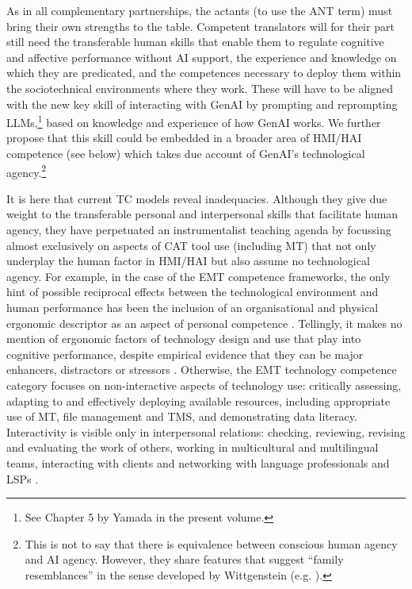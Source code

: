 \documentclass[output=paper]{langscibook}
\begin{document}
As in all complementary partnerships, the actants (to use the ANT term) must bring their own strengths to the table. Competent translators will for their part still need the transferable human skills that enable them to regulate cognitive and affective performance without AI support, the experience and knowledge on which they are predicated, and the competences necessary to deploy them within the sociotechnical environments where they work. These will have to be aligned with the new key skill of interacting with GenAI by prompting and reprompting LLMs,\footnote{ \textrm{See} Chapter 5 by Yamada \textrm{in the present volume.}} based on knowledge and experience of how GenAI works. We further propose that this skill could be embedded in a broader area of HMI/HAI competence (see below) which takes due account of GenAI’s technological agency.\footnote{ \textrm{This is not to say that there is equivalence between conscious human agency and AI agency. However, they share features that suggest “family resemblances” in the sense developed by Wittgenstein (e.g. \citeyear[32]{wittgenstein_philosophical_1958}).}}

It is here that current TC models reveal inadequacies. Although they give due weight to the transferable personal and interpersonal skills that facilitate human agency, they have perpetuated an instrumentalist teaching agenda 
by focussing almost exclusively on aspects of CAT tool use (including MT) that not only underplay the human factor in HMI/HAI but also assume no technological agency. For example, in the case of the EMT competence frameworks, the only hint of possible reciprocal effects between the technological environment and human performance has been the inclusion of an organisational and physical ergonomic descriptor as an aspect of personal competence \citep[10]{emt_european_2022}. Tellingly, it makes no mention of ergonomic factors of technology design and use that play into cognitive performance, despite empirical evidence that they can be major enhancers, distractors or stressors \citep{ehrensberger-dow_international_2016}. Otherwise, the EMT technology competence category focuses on non-interactive aspects of technology use: critically assessing, adapting to and effectively deploying available resources, including appropriate use of MT, file management and TMS, and demonstrating data literacy. Interactivity is visible only in interpersonal relations: checking, reviewing, revising and evaluating the work of others, working in multicultural and multilingual teams, interacting with clients and networking with language professionals and LSPs \citep[8--11]{emt_european_2022}.
\end{document}
